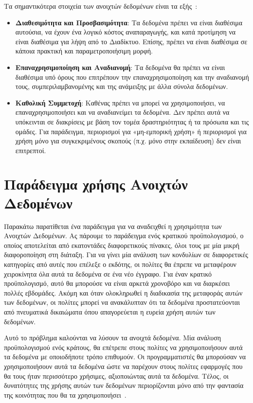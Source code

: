\documentclass[oneside, 12pt]{book}
\begin{document}
Τα σημαντικότερα στοιχεία των ανοιχτών δεδομένων είναι τα εξής~\cite{OpenData_definition}:
\begin{itemize}
    \item \textbf{Διαθεσιμότητα και Προσβασιμότητα}: Τα δεδομένα 
    πρέπει να είναι διαθέσιμα αυτούσια, να έχουν ένα λογικό κόστος 
    αναπαραγωγής, και κατά προτίμηση να είναι διαθέσιμα για λήψη από 
    το Διαδίκτυο. Επίσης, πρέπει να είναι διαθέσιμα σε κάποια πρακτική 
    και παραμετροποιήσιμη μορφή.
    \item \textbf{Επαναχρησιμοποίηση και Αναδιανομή}: Τα δεδομένα 
    θα πρέπει να είναι διαθέσιμα υπό όρους που επιτρέπουν την 
    επαναχρησιμοποίηση και την αναδιανομή τους, συμπεριλαμβανομένης 
    και της ανάμειξης με άλλα σύνολα δεδομένων.
    \item \textbf{Καθολική Συμμετοχή}: Καθένας πρέπει να μπορεί 
    να χρησιμοποιήσει, να επαναχρησιμοποιήσει και να αναδιανείμει τα
    δεδομένα. Δεν πρέπει αυτά να υπόκεινται σε διακρίσεις με βάση τον 
    τομέα δραστηριότητας ή τα πρόσωπα και τις ομάδες. Για παράδειγμα, 
    περιορισμοί για «μη-εμπορική χρήση» ή περιορισμοί για χρήση μόνο 
    για συγκεκριμένους σκοπούς (π.χ. μόνο στην εκπαίδευση) δεν είναι 
    επιτρεπτοί.
\end{itemize}


\section{Παράδειγμα χρήσης Ανοιχτών Δεδομένων}
Παρακάτω παρατίθεται ένα παράδειγμα για να αναδειχθεί η
χρησιμότητα των Ανοιχτών Δεδομένων.
Ας πάρουμε το παράδειγμα ενός κρατικού προϋπολογισμού, ο οποίος 
αποτελείται από εκατοντάδες διαφορετικούς πίνακες, όλοι τους με μία 
μικρή διαφοροποίηση στη διάταξη.
Για να γίνει μία ανάλυση των κονδυλίων σε διαφορετικές κατηγορίες από 
αυτές που επέλεξε ο εκδότης, οι πολίτες θα έπρεπε να μεταφέρουν 
χειροκίνητα όλα αυτά τα δεδομένα σε ένα νέο έγγραφο. Για έναν κρατικό 
προϋπολογισμό, αυτό θα μπορούσε να είναι αρκετά χρονοβόρο και να διαρκέσει πολλές εβδομάδες.
Ακόμη και όταν ολοκληρωθεί η διαδικασία της μεταφοράς αυτών των 
δεδομένων, οι πολίτες μπορεί να ανακάλυπταν ότι τα δεδομένα 
προστατεύονται από πνευματικά δικαιώματα όπου απαγορεύεται η ευρεία 
χρήση αυτών των δεδομένων.

Αυτό το πρόβλημα καλούνται να λύσουν τα ανοιχτά δεδομένα.
Μία ανάλυση προϋπολογισμού ενός κράτους, θα επέτρεπε στους πολίτες να 
χρησιμοποιήσουν αυτά τα δεδομένα με οποιοδήποτε τρόπο επιθυμούν.
Οι προγραμματιστές θα μπορούσαν να χρησιμοποιήσουν αυτά τα δεδομένα 
ώστε να παρέχουν στους πολίτες εφαρμογές που θα τους ήταν περισσότερο 
χρήσιμες, αξιοποιώντας αυτά τα δεδομένα.
Τέλος, οι δυνατότητες της χρήσης αυτών των δεδομένων περιορίζονται 
μόνο από την φαντασία της κοινότητας που θα τα χρησιμοποιήσει~\cite{davies2012might}.
\end{document}
